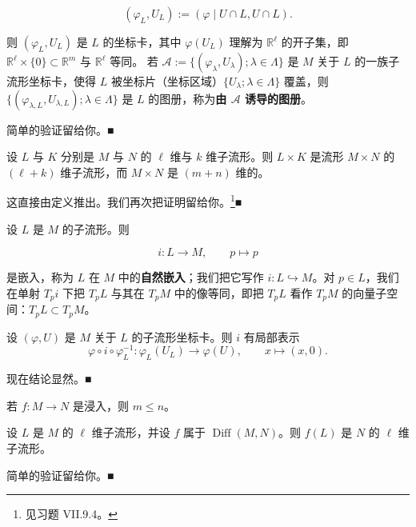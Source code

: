 \begin{remark}
\begin{items}
\[
(\varphi_L,U_L):=(\varphi\mid U\cap L,U\cap L).
\]

则 $ (\varphi_L,U_L) $ 是 $ L $ 的坐标卡，其中 $ \varphi(U_L) $ 理解为 $ \mathbb{R}^\ell $ 的开子集，即 $ \mathbb{R}^\ell\times\{0\}\subset\mathbb{R}^m $ 与 $ \mathbb{R}^\ell $ 等同。
若 $ \mathcal{A}:=\{(\varphi_\lambda,U_\lambda);\lambda\in\Lambda\} $ 是 $ M $ 关于 $ L $ 的一族子流形坐标卡，使得 $ L $ 被坐标片（坐标区域）$ \{U_\lambda;\lambda\in\Lambda\} $ 覆盖，则 $ \{(\varphi_{\lambda,L},U_{\lambda,L});\lambda\in\Lambda\} $ 是 $ L $ 的图册，称为\textbf{由 $ \mathcal{A} $ 诱导的图册}。

\proofhead
简单的验证留给你。\nobreak\hspace{0.35em}■
\item

设 $ L $ 与 $ K $ 分别是 $ M $ 与 $ N $ 的 $ \ell $ 维与 $ k $ 维子流形。则 $ L\times K $ 是流形 $ M\times N $ 的 $ (\ell+k) $ 维子流形，而 $ M\times N $ 是 $ (m+n) $ 维的。

\proofhead
这直接由定义推出。我们再次把证明留给你。\footnote{见习题 VII.9.4。}\nobreak\hspace{0.35em}■
\item

设 $ L $ 是 $ M $ 的子流形。则

\[
i:L\to M,\qquad p\mapsto p
\]

是嵌入，称为 $ L $ 在 $ M $ 中的\textbf{自然嵌入}；我们把它写作 $ i:L\hookrightarrow M $。对 $ p\in L $，我们在单射 $ T_p i $ 下把 $ T_p L $ 与其在 $ T_p M $ 中的像等同，即把 $ T_p L $ 看作 $ T_p M $ 的向量子空间：$ T_p L\subset T_p M $。

\proofhead
设 $ (\varphi,U) $ 是 $ M $ 关于 $ L $ 的子流形坐标卡。则 $ i $ 有局部表示
\[
\varphi\circ i\circ\varphi_L^{-1}:\varphi_L(U_L)\to\varphi(U),\qquad x\mapsto(x,0).
\]

现在结论显然。\nobreak\hspace{0.35em}■

\item

若 $ f:M\to N $ 是浸入，则 $ m\le n $。

\item

设 $ L $ 是 $ M $ 的 $ \ell $ 维子流形，并设 $ f $ 属于 $ \operatorname{Diff}(M,N) $。则 $ f(L) $ 是 $ N $ 的 $ \ell $ 维子流形。

\proofhead
简单的验证留给你。\nobreak\hspace{0.35em}■
\item


\end{items}
\end{remark}
